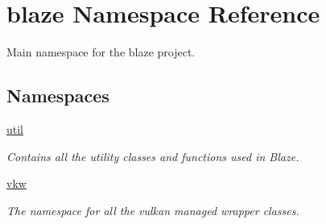 \hypertarget{namespaceblaze}{}\section{blaze Namespace Reference}
\label{namespaceblaze}


Main namespace for the blaze project.  


\subsection*{Namespaces}
\begin{DoxyCompactItemize}
\item 
 \hyperlink{namespaceblaze_1_1util}{util}
\begin{DoxyCompactList}\small\item\em Contains all the utility classes and functions used in Blaze. \end{DoxyCompactList}\item 
 \hyperlink{namespaceblaze_1_1vkw}{vkw}
\begin{DoxyCompactList}\small\item\em The namespace for all the vulkan managed wrapper classes. \end{DoxyCompactList}\end{DoxyCompactItemize}
